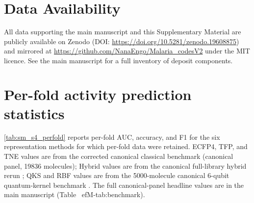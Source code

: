 \documentclass[11pt,a4paper]{article}
\begin{document}
\section*{Data Availability}

All data supporting the main manuscript and this Supplementary Material are publicly available on Zenodo (DOI: \url{https://doi.org/10.5281/zenodo.19608875}) and mirrored at \url{https://github.com/NanaEngo/Malaria_codesV2} under the MIT licence. See the main manuscript for a full inventory of deposit components.






\section{Per-fold activity prediction statistics}
\label{sec:per_fold}

 \cref{tab:sm_s4_perfold} reports per-fold AUC, accuracy, and F1 for the six representation methods for which per-fold data were retained. ECFP4, TFP, and TNE values are from the corrected canonical classical benchmark (canonical panel, \num{19836} molecules); Hybrid values are from the canonical full-library hybrid rerun ; QKS and RBF values are from the \num{5000}-molecule canonical 6-qubit quantum-kernel benchmark . The full canonical-panel headline values are in the main manuscript (Table~
ef{M-tab:benchmark}).
\end{document}

